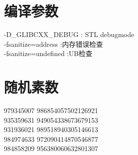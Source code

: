 \section{编译参数}
-D\_GLIBCXX\_DEBUG : STL debugmode\\
-fsanitize=address :内存错误检查\\
-fsanitize=undefined :UB检查
\section{随机素数}
979345007 986854057502126921\\
935359631 949054338673679153\\
931936021 989518940305146613\\
984974633 972090414870546877\\
984858209 956380060632801307\\
